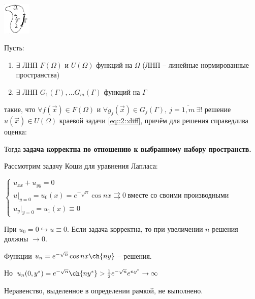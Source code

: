 \documentclass[../main.tex]{subfiles}
\begin{document}
\begin{center}
\includegraphics[width=0.1\textwidth]{2_3_new}
\end{center}

\begin{definition}
Пусть:
\begin{enumerate}[noitemsep]
\item $\exists$ ЛНП $F(\Omega)$ и $U(\Omega)$ функций на $\Omega$ (ЛНП -- линейные нормированные пространства) 
\item $\exists$ ЛНП $G_1(\Gamma),\dots G_m(\Gamma)$ функций на $\Gamma$
\end{enumerate}
такие, что $\forall f(\vec{x}) \in F(\Omega) \text{ и } \forall g_j(\vec{x}) \in G_j(\Gamma),\ j=\overline{1,m}\ \exists!$ решение $u(\vec{x}) \in U(\Omega)$ краевой задачи \eqref{eq::2::diff}, причём для решения справедлива оценка:  

Тогда {\bf задача корректна по отношению к выбранному набору пространств.}
\end{definition}

\begin{example}[Адамара]
Рассмотрим задачу Коши для уравнения Лапласа:

$\begin{cases} u_{xx}+u_{yy} = 0 \\
u|_{y=0} = u_0(x) = e^{-\sqrt{n}}\cos{nx} \rightrightarrows 0\ \text{вместе со своими производными} \\
u_y|_{y=0} = u_1(x) \equiv 0
\end{cases}$

При $u_0 = 0 \hookrightarrow u\equiv 0$. Если задача корректна, то при увеличении $n$ решения должны $\rightarrow 0$. 

Функции $u_n=e^{-\sqrt{n}}\cos{nx}\ch{ny}$ -- решения.

Но $u_n(0, y^*) = e^{-\sqrt{n}}\ch{ny^*} > \frac1{2}e^{-\sqrt{n}}e^{ny^*} \rightarrow \infty$

Неравенство, выделенное в определении рамкой, не выполнено.
\end{example}
\end{document}
